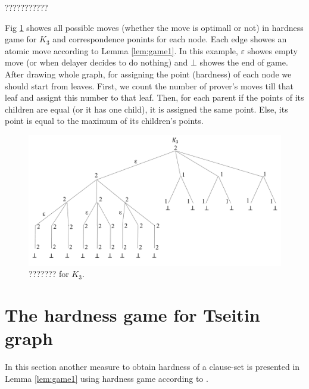 \documentclass[]{book}
\begin{document}
	\begin{examp}\label{exp:gg1}
      ???????????
	  
	  Fig \ref{fig:gg1} showes all possible moves (whether the move is optimall or not) in hardness game for $K_3$ and correspondence ponints
	  for each node.
	  Each edge showes an atomic move according to Lemma \ref{lem:game1}. In this example, $\varepsilon $ showes empty move 
	  (or when delayer decides to do nothing) and $\bot$ showes the end of game.
	  After drawing whole graph, for assigning the point (hardness) of each node we should start from leaves. First, 
	  we count the number of prover's moves till that leaf and assignt this number to that leaf. Then, for each parent if the 
	  points of its children are equal (or it has one child), it is assigned the same point. Else, its point is equal to the maximum of its children's 
	  points.
	  \begin{figure}
      \begin{center}
      \includegraphics[scale =0.6]{gg1.png}
      \caption{??????? for $K_3$.}
	  \label{fig:gg1}
      \end{center}
      \end{figure}

\end{examp}  

\section{The hardness game for Tseitin graph}
\label{sec:Hardness Tseitin}	  

In this section another measure to obtain hardness of a clause-set is presented in Lemma \ref{lem:game1} using hardness game according to \cite{h5}.
\end{document}
